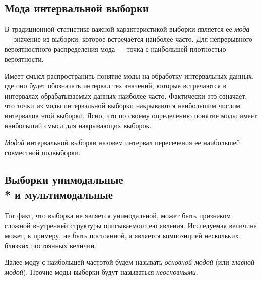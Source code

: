 \documentclass[a5paper,openany]{book}
\begin{document}
\subsection{Мода интервальной выборки} 
\label{ModeSampleSect} 

В традиционной статистике важной характеристикой выборки является ее \emph{мода} 
--- значение из выборки, которое встречается наиболее часто. Для непрерывного 
вероятностного распределения мода --- точка с наибольшей плотностью вероятности. 

Имеет смысл  распространить понятие моды на обработку интервальных данных, где оно 
будет обозначать интервал тех значений, которые встречаются 
в интервалах обрабатываемых данных наиболее часто. Фактически это означает, что 
точки из моды интервальной выборки накрываются наибольшим числом интервалов этой 
выборки. 
Ясно, что по своему определению понятие моды имеет  наибольший смысл для накрывающих выборок. 
\begin{definition} 
\textsl{Модой} интервальной выборки назовем интервал пересечения ее наибольшей 
совместной подвыборки.   
\end{definition} 

\subsection[Выборки унимодальные и мультимодальные]%
{Выборки унимодальные \\* и мультимодальные} 
\label{UniMultiModSect} 

Тот факт, что выборка не является унимодальной, может быть признаком сложной 
внутренней структуры описываемого ею явления. 
Исследуемая величина может, к примеру, не быть 
постоянной, а является композицией нескольких близких постоянных величин. 

Далее моду с наибольшей частотой 
будем называть \emph{основной модой} (или \emph{главной модой}). Прочие 
моды выборки будут называться \emph{неосновными}.   


\end{document}
